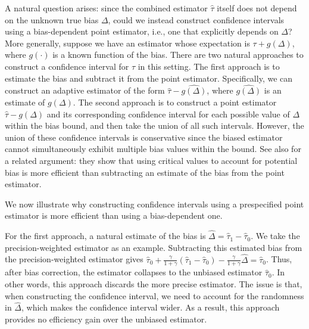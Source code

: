 \documentclass[11pt]{article}
\def\cI{{\mathcal I}}
\newcommand{\htau}{\widehat\tau}
\numberwithin{equation}{section}
\theoremstyle{definition}
\begin{document}
A natural question arises: since the combined estimator $\hat\tau$ itself does not depend on the unknown true bias $\Delta$, could we instead construct confidence intervals using a bias-dependent point estimator, i.e., one that explicitly depends on $\Delta$? More generally, suppose we have an estimator whose expectation is $\tau + g(\Delta)$, where $g(\cdot)$ is a known function of the bias. There are two natural approaches to construct a confidence interval for $\tau$ in this setting. The first approach is to estimate the bias and subtract it from the point estimator. Specifically, we can construct an adaptive estimator of the form $\hat\tau - \widehat{g(\Delta)}$, where $\widehat{g(\Delta)}$ is an estimate of $g(\Delta)$. The second approach is to construct a point estimator $\hat\tau - g(\Delta)$ and its corresponding confidence interval for each possible value of $\Delta$ within the bias bound, and then take the union of all such intervals. However, the union of these confidence intervals is conservative since the biased estimator cannot simultaneously exhibit multiple bias values within the bound.
See also \cite{armstrong2020simple} for a related argument: they show that using critical values to account for potential bias is more efficient than subtracting an estimate of the bias from the point estimator.


We now illustrate why constructing confidence intervals using a prespecified point estimator is more efficient than using a bias-dependent one.

For the first approach, a natural estimate of the bias is $\hat\Delta = \hat\tau_1 - \hat\tau_0$. We take the precision-weighted estimator as an example. Subtracting this estimated bias from the precision-weighted estimator gives $\htau_0 + \frac{\gamma}{1+\gamma} (\htau_1 - \htau_0) - \frac{\gamma}{1+\gamma} \hat\Delta = \htau_0$. Thus, after bias correction, the estimator collapses to the unbiased estimator $\hat\tau_0$. In other words, this approach discards the more precise estimator. The issue is that, when constructing the confidence interval, we need to account for the randomness in $\hat\Delta$, which makes the confidence interval wider. As a result, this approach provides no efficiency gain over the unbiased estimator.
\end{document}
